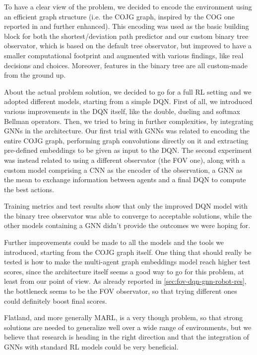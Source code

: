 \documentclass[a4paper,10pt]{report}
\begin{document}
To have a clear view of the problem, we decided to encode the environment using an efficient graph structure (i.e. the COJG graph, inspired by the COG one reported in \cite{jonas} and further enhanced). This encoding was used as the basic building block for both the shortest/deviation path predictor and our custom binary tree observator, which is based on the default tree observator, but improved to have a smaller computational footprint and augmented with various findings, like real decisions and choices. Moreover, features in the binary tree are all custom-made from the ground up.

About the actual problem solution, we decided to go for a full RL setting and we adopted different models, starting from a simple DQN. First of all, we introduced various improvements in the DQN itself, like the double, dueling and softmax Bellman operators. Then, we tried to bring in further complexities, by integrating GNNs in the architecture. Our first trial with GNNs was related to encoding the entire COJG graph, performing graph convolutions directly on it and extracting pre-defined embeddings to be given as input to the DQN. The second experiment was instead related to using a different observator (the FOV one), along with a custom model comprising a CNN as the encoder of the observation, a GNN as the mean to exchange information between agents and a final DQN to compute the best actions.

Training metrics and test results show that only the improved DQN model with the binary tree observator was able to converge to acceptable solutions, while the other models containing a GNN didn't provide the outcomes we were hoping for.

Further improvements could be made to all the models and the tools we introduced, starting from the COJG graph itself. One thing that should really be tested is how to make the multi-agent graph embeddings model reach higher test scores, since the architecture itself seems a good way to go for this problem, at least from our point of view. As already reported in \ref{sec:fov-dqn-gnn-robot-res}, the bottleneck seems to be the FOV observator, so that trying different ones could definitely boost final scores.

Flatland, and more generally MARL, is a very though problem, so that strong solutions are needed to generalize well over a wide range of environments, but we believe that research is heading in the right direction and that the integration of GNNs with standard RL models could be very beneficial.

\printbibliography
\end{document}
